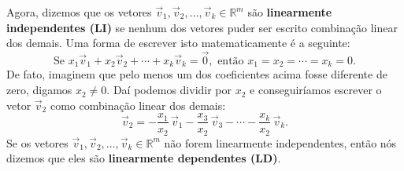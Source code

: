 Agora, dizemos que os vetores $\vec{v}_1, \vec{v}_2, \dots, \vec{v}_k  \in \mathbb{R}^m$ são \textbf{linearmente independentes (LI)} se nenhum dos vetores puder ser escrito combinação linear dos demais. Uma forma de escrever isto matematicamente é a seguinte:
\begin{equation}
\boxed{\text{Se } x_1 \vec{v}_1 + x_2 \vec{v}_2 + \cdots + x_k \vec{v}_k = \vec{0}, \text{ então } x_1 = x_2 = \cdots = x_k = 0.}
\end{equation} De fato, imaginem que pelo menos um dos coeficientes acima fosse diferente de zero, digamos $x_2 \neq 0$. Daí podemos dividir por $x_2$ e conseguiríamos escrever o vetor $\vec{v}_2$ como combinação linear dos demais:
\begin{equation}
\vec{v}_2 = - \frac{x_1}{x_2} \, \vec{v}_1 - \frac{x_3}{x_2} \, \vec{v}_3 - \cdots - \frac{x_k}{x_2} \, \vec{v}_k.
\end{equation} Se os vetores $\vec{v}_1, \vec{v}_2, \dots, \vec{v}_k  \in \mathbb{R}^m$ não forem linearmente independentes, então nós dizemos que eles são \textbf{linearmente dependentes (LD)}.

